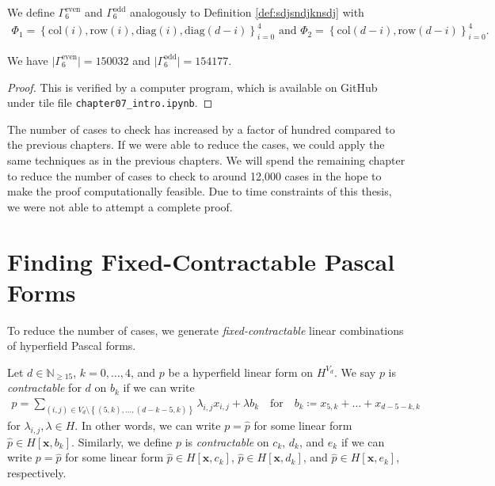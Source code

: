 \begin{definition}
    We define \(  \Gamma^{\mathrm{even}}_6 \) and \( \Gamma^{\mathrm{odd}}_6 \) analogously to Definition \ref{def:sdjsndjknsdj} with 
    \begin{gather*}
        \Phi_1 = \left\{ \mathrm{col}(i), \mathrm{row}(i), \mathrm{diag}(i), \mathrm{diag}(d-i) \right\}_{i=0}^4 \text{ and } \Phi_2 = \left\{ \mathrm{col}(d-i), \mathrm{row}(d-i) \right\}_{i=0}^4.
    \end{gather*}
\end{definition}

\begin{proposition}
    We have \( \lvert \Gamma^{\mathrm{even}}_6 \rvert  = 150032\) and \( \lvert \Gamma^{\mathrm{odd}}_6 \rvert  = 154177\).
\end{proposition}

\begin{proof}
    This is verified by a computer program, which is available on GitHub \cite{ducrepo} under tile file \texttt{chapter07\_intro.ipynb}.
\end{proof}

The number of cases to check has increased by a factor of hundred compared to the previous chapters. If we were able to reduce the cases, we could apply the same techniques as in the previous chapters. We will spend the remaining chapter to reduce the number of cases to check to around 12,000 cases in the hope to make the proof computationally feasible. Due to time constraints of this thesis, we were not able to attempt a complete proof.

\section{Finding Fixed-Contractable Pascal Forms}

To reduce the number of cases, we generate \emph{fixed-contractable} linear combinations of hyperfield Pascal forms.

\begin{definition}
    Let \( d \in \mathbb{N}_{\geq 15} \), \( k = 0, \dots ,4 \), and \( p \) be a hyperfield linear form on \( H^{V_d} \). We say \( p \) is \emph{contractable} for \( d \) on \( b_k \) if we can write
    \begin{align*}
        p = \sum_{(i,j) \in V_d \setminus \left\{ (5,k), \dots, (d-k-5, k) \right\}} \lambda_{i,j} x_{i,j}  +\lambda b_k \quad \text{for} \quad b_k \coloneqq x_{5,k} + \dots + x_{d-5-k,k}
    \end{align*}
    for \( \lambda_{i,j}, \lambda \in H \). In other words, we can write \( p = \hat p \) for some linear form \( \hat p \in H[\mathbf{x}, b_k] \). 
    Similarly, we define \( p \) is \emph{contractable} on \( c_k \), \( d_k \), and \( e_k \) if we can write \( p = \hat p \) for some linear form \( \hat p \in H[\mathbf{x}, c_k] \), \( \hat p \in H[\mathbf{x}, d_k] \), and \( \hat p \in H[\mathbf{x}, e_k] \), respectively.
\end{definition}

